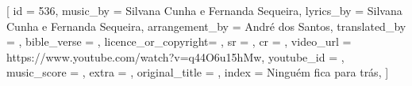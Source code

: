 [
    id                  = {536},
    music_by            = {Silvana Cunha e Fernanda Sequeira}, %
    lyrics_by           = {Silvana Cunha e Fernanda Sequeira}, %
    arrangement_by      = {André dos Santos}, %
    translated_by       = {}, %
    bible_verse         = {},
    licence_or_copyright= {},
    sr                  = {},
    cr                  = {},
    video_url           = {https://www.youtube.com/watch?v=q44O6u15hMw}, %
    youtube_id          = {}, %
    music_score         = {}, %
    extra               = {},
    original_title      = {}, %
    index               = {Ninguém fica para trás},
]

